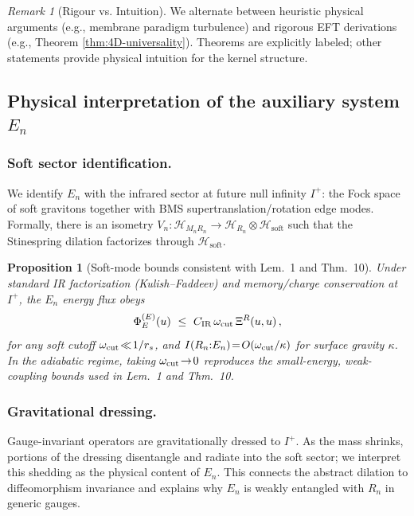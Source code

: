 \documentclass[aps,prd,preprint,onecolumn,superscriptaddress,nofootinbib,longbibliography,floatfix,11pt,showpacs,showkeys]{revtex4-2}
\newcommand{\Iplus}{I^{+}}
\theoremstyle{plain}
\newtheorem{proposition}[theorem]{Proposition}
\theoremstyle{definition}
\theoremstyle{remark}
\newtheorem{remark}[theorem]{Remark}
\begin{document}
\begin{remark}[Rigour vs. Intuition]
We alternate between heuristic physical arguments (e.g., membrane paradigm turbulence) and rigorous EFT derivations (e.g., Theorem \ref{thm:4D-universality}). Theorems are explicitly labeled; other statements provide physical intuition for the kernel structure.
\end{remark}

\subsection*{Physical interpretation of the auxiliary system $E_n$}
\label{sec:En-soft}
\subsubsection{Soft sector identification.}
We identify $E_n$ with the infrared sector at future null infinity $\Iplus$: the Fock space of soft gravitons together with BMS supertranslation/rotation edge modes.
Formally, there is an isometry $V_n:\mathcal{H}_{M_nR_n}\!\to\!\mathcal{H}_{R_n}\otimes\mathcal{H}_{\mathrm{soft}}$ such that the Stinespring dilation factorizes through $\mathcal{H}_{\mathrm{soft}}$.
\begin{proposition}[Soft-mode bounds consistent with Lem.~1 and Thm.~10]\label{prop:En-soft}
Under standard IR factorization (Kulish--Faddeev) and memory/charge conservation at $\Iplus$, the $E_n$ energy flux obeys
\begin{equation}
\Phi_E^{(E)}(u)\ \le\ C_{\rm IR}\,\omega_{\rm cut}\,\Xi^R(u,u)\,,
\end{equation}
for any soft cutoff $\omega_{\rm cut}\!\ll\! 1/r_s$, and $I(R_n{:}E_n)\!=\!O(\omega_{\rm cut}/\kappa)$ for surface gravity $\kappa$.
In the adiabatic regime, taking $\omega_{\rm cut}\!\to\!0$ reproduces the small-energy, weak-coupling bounds used in Lem.~1 and Thm.~10.
\end{proposition}
\subsubsection{Gravitational dressing.}
Gauge-invariant operators are gravitationally dressed to $\Iplus$.
As the mass shrinks, portions of the dressing disentangle and radiate into the soft sector; we interpret this shedding as the physical content of $E_n$.
This connects the abstract dilation to diffeomorphism invariance and explains why $E_n$ is weakly entangled with $R_n$ in generic gauges.
\end{document}
